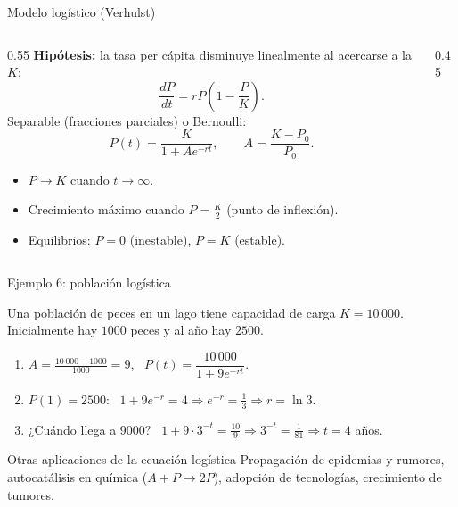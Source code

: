 \documentclass[10pt,aspectratio=169]{beamer}
\begin{document}
\begin{frame}{Modelo logístico (Verhulst)}
  \begin{columns}
    \begin{column}{0.55\textwidth}
      \textbf{Hipótesis:} la tasa per cápita disminuye linealmente al acercarse a la  $K$:
      \[ \frac{dP}{dt}=rP\left(1-\frac PK\right). \]
      Separable (fracciones parciales) o Bernoulli:
      \[ \boxed{P(t)=\frac{K}{1+Ae^{-rt}}},\qquad A=\frac{K-P_0}{P_0}. \]
      \begin{itemize}
        \item $P\to K$ cuando $t\to\infty$.
        \item Crecimiento máximo cuando $P=\frac K2$ (punto de inflexión).
        \item Equilibrios: $P=0$ (inestable), $P=K$ (estable).
      \end{itemize}
    \end{column}
    \begin{column}{0.45\textwidth}
      \centering
    \end{column}
  \end{columns}
\end{frame}

\begin{frame}{Ejemplo 6: población logística}
  \begin{ejemplo}
    Una población de peces en un lago tiene capacidad de carga $K=10\,000$. Inicialmente hay $1000$ peces y al año hay $2500$.
    \begin{enumerate}
      \item $A=\frac{10\,000-1000}{1000}=9$, \ $P(t)=\dfrac{10\,000}{1+9e^{-rt}}$.
      \item $P(1)=2500$: \ $1+9e^{-r}=4\Rightarrow e^{-r}=\frac13\Rightarrow r=\ln3$.
      \item ¿Cuándo llega a $9000$? \ $1+9\cdot3^{-t}=\frac{10}9\Rightarrow3^{-t}=\frac1{81}\Rightarrow t=4$ años.
    \end{enumerate}
  \end{ejemplo}
  \begin{block}{Otras aplicaciones de la ecuación logística}
    Propagación de epidemias y rumores, autocatálisis en química ($A+P\to2P$), adopción de tecnologías, crecimiento de tumores.
  \end{block}
\end{frame}
\end{document}
